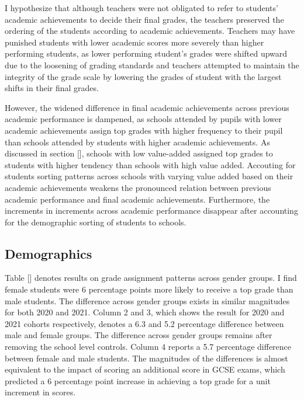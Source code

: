 I hypothesize that although teachers were not obligated to refer to students' academic achievements to decide their final grades, the teachers preserved the ordering of the students according to academic achievements. Teachers may have punished students with lower academic scores more severely than higher performing students, as lower performing student's grades were shifted upward due to the loosening of grading standards and teachers attempted to maintain the integrity of the grade scale by lowering the grades of student with the largest shifts in their final grades. 

However, the widened difference in final academic achievements across previous academic performance is dampened, as schools attended by pupils with lower academic achievements assign top grades with higher frequency to their pupil than schools attended by students with higher academic achievements.  As discussed in section [], schools with low value-added assigned top grades to students with higher tendency than schools with high value added. Accouting for students sorting patterns across schools with varying value added based on their academic achievements weakens the pronounced relation between previous academic performance and final academic achievements. Furthermore, the increments in increments across academic performance disappear after accounting for the demographic sorting of students to schools.  

\subsection{Demographics}
Table [] denotes results on grade assignment patterns across gender groups. I find female students were 6 percentage points more likely to receive a top grade than male students. The difference across gender groups exists in similar magnitudes for both 2020 and 2021. Column 2 and 3, which shows the result for 2020 and 2021 cohorts respectively, denotes a 6.3 and 5.2 percentage difference between male and female groups. The difference across gender groups remains after removing the school level controls. Column 4 reports a 5.7 percentage difference between female and male students. The magnitudes of the differences is almost equivalent to the impact of scoring an additional score in GCSE exams, which predicted a 6 percentage point increase in achieving a top grade for a unit increment in scores. 

